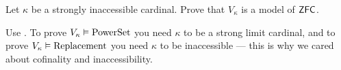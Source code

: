 \begin{sproblem}
	\label{prob:inaccessible_model}
	\onechili
	Let $\kappa$ be a strongly inaccessible cardinal.
	Prove that $V_\kappa$ is a model of $\mathsf{ZFC}$.
	\begin{hint}
		Use .
		To prove $V_\kappa \vDash \mathrm{PowerSet}$ you need $\kappa$ to be a strong limit cardinal,
		and to prove $V_\kappa \vDash \mathrm{Replacement}$ you need $\kappa$ to be inaccessible ---
		this is why we cared about cofinality and inaccessibility.
	\end{hint}
\end{sproblem}
